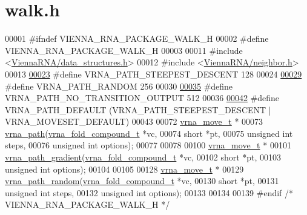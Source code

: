 \hypertarget{walk_8h_source}{}\section{walk.\+h}
\label{walk_8h_source}

\begin{DoxyCode}
00001 \textcolor{preprocessor}{#ifndef VIENNA\_RNA\_PACKAGE\_WALK\_H}
00002 \textcolor{preprocessor}{#define VIENNA\_RNA\_PACKAGE\_WALK\_H}
00003 
00011 \textcolor{preprocessor}{#include <\hyperlink{data__structures_8h}{ViennaRNA/data\_structures.h}>}
00012 \textcolor{preprocessor}{#include <\hyperlink{neighbor_8h}{ViennaRNA/neighbor.h}>}
00013 
\hyperlink{group__paths_ga705cea2b3243a38a2d6e3b1e141ed061}{00023} \textcolor{preprocessor}{#define  VRNA\_PATH\_STEEPEST\_DESCENT 128}
00024 
\hyperlink{group__paths_ga0b84bd36bfd783130297797c51dd85ae}{00029} \textcolor{preprocessor}{#define  VRNA\_PATH\_RANDOM           256}
00030 
\hyperlink{group__paths_ga1ee63e54ecf136491e12ff03ede2622d}{00035} \textcolor{preprocessor}{#define  VRNA\_PATH\_NO\_TRANSITION\_OUTPUT          512}
00036 
\hyperlink{group__paths_gaf1bb1f8fec8d24e3b821f621b19f77b4}{00042} \textcolor{preprocessor}{#define VRNA\_PATH\_DEFAULT   (VRNA\_PATH\_STEEPEST\_DESCENT | VRNA\_MOVESET\_DEFAULT)}
00043 
00072 \hyperlink{group__neighbors_structvrna__move__s}{vrna\_move\_t} *
00073 \hyperlink{group__paths_ga327c96463d698e7863508499cacce9ab}{vrna\_path}(\hyperlink{group__fold__compound_structvrna__fc__s}{vrna\_fold\_compound\_t}  *vc,
00074           \textcolor{keywordtype}{short}                 *pt,
00075           \textcolor{keywordtype}{unsigned} \textcolor{keywordtype}{int}          steps,
00076           \textcolor{keywordtype}{unsigned} \textcolor{keywordtype}{int}          options);
00077 
00078 
00100 \hyperlink{group__neighbors_structvrna__move__s}{vrna\_move\_t} *
00101 \hyperlink{group__paths_gafa18d5153ee540ddd9b93aba59d26184}{vrna\_path\_gradient}(\hyperlink{group__fold__compound_structvrna__fc__s}{vrna\_fold\_compound\_t} *vc,
00102                    \textcolor{keywordtype}{short}                *pt,
00103                    \textcolor{keywordtype}{unsigned} \textcolor{keywordtype}{int}         options);
00104 
00105 
00128 \hyperlink{group__neighbors_structvrna__move__s}{vrna\_move\_t} *
00129 \hyperlink{group__paths_ga49cfe462288be44e0dd88c96da79acbf}{vrna\_path\_random}(\hyperlink{group__fold__compound_structvrna__fc__s}{vrna\_fold\_compound\_t} *vc,
00130                  \textcolor{keywordtype}{short}                *pt,
00131                  \textcolor{keywordtype}{unsigned} \textcolor{keywordtype}{int}         steps,
00132                  \textcolor{keywordtype}{unsigned} \textcolor{keywordtype}{int}         options);
00133 
00134 
00139 \textcolor{preprocessor}{#endif }\textcolor{comment}{/* VIENNA\_RNA\_PACKAGE\_WALK\_H */}\textcolor{preprocessor}{}
\end{DoxyCode}
